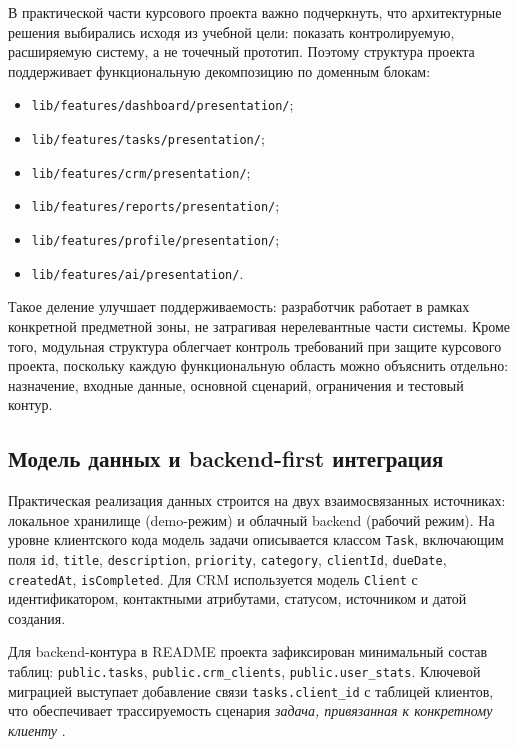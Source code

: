 В практической части курсового проекта важно подчеркнуть, что архитектурные решения выбирались исходя из учебной цели: показать контролируемую, расширяемую систему, а не точечный прототип. Поэтому структура проекта поддерживает функциональную декомпозицию по доменным блокам:
\begin{itemize}
  \item \texttt{lib/features/dashboard/presentation/};
  \item \texttt{lib/features/tasks/presentation/};
  \item \texttt{lib/features/crm/presentation/};
  \item \texttt{lib/features/reports/presentation/};
  \item \texttt{lib/features/profile/presentation/};
  \item \texttt{lib/features/ai/presentation/}.
\end{itemize}

Такое деление улучшает поддерживаемость: разработчик работает в рамках конкретной предметной зоны, не затрагивая нерелевантные части системы. Кроме того, модульная структура облегчает контроль требований при защите курсового проекта, поскольку каждую функциональную область можно объяснить отдельно: назначение, входные данные, основной сценарий, ограничения и тестовый контур.

\subsection{Модель данных и backend-first интеграция}

Практическая реализация данных строится на двух взаимосвязанных источниках: локальное хранилище (demo-режим) и облачный backend (рабочий режим). На уровне клиентского кода модель задачи описывается классом \texttt{Task}, включающим поля \texttt{id}, \texttt{title}, \texttt{description}, \texttt{priority}, \texttt{category}, \texttt{clientId}, \texttt{dueDate}, \texttt{createdAt}, \texttt{isCompleted}. Для CRM используется модель \texttt{Client} с идентификатором, контактными атрибутами, статусом, источником и датой создания.

Для backend-контура в README проекта зафиксирован минимальный состав таблиц: \texttt{public.tasks}, \texttt{public.crm\_clients}, \texttt{public.user\_stats}. Ключевой миграцией выступает добавление связи \texttt{tasks.client\_id} с таблицей клиентов, что обеспечивает трассируемость сценария \textit{задача, привязанная к конкретному клиенту} \cite{repoReadme,migrationClientId,bootstrapSchema}.

